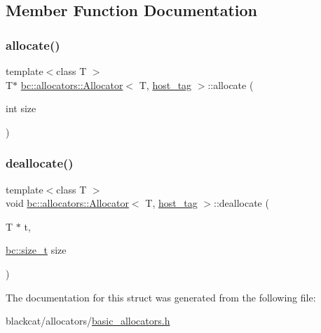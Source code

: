 \subsection{Member Function Documentation}
\mbox{\label{structbc_1_1allocators_1_1Allocator_3_01T_00_01host__tag_01_4_a7dc1bfcee83cc2986902722308a0a180}} 
\subsubsection{\texorpdfstring{allocate()}{allocate()}}
{\footnotesize\ttfamily template$<$class T $>$ \\
T$\ast$ \hyperlink{classbc_1_1allocators_1_1Allocator}{bc\+::allocators\+::\+Allocator}$<$ T, \hyperlink{structbc_1_1host__tag}{host\+\_\+tag} $>$\+::allocate (\begin{DoxyParamCaption}\item[{int}]{size }\end{DoxyParamCaption})\hspace{0.3cm}{\ttfamily [inline]}}

\mbox{\label{structbc_1_1allocators_1_1Allocator_3_01T_00_01host__tag_01_4_a57811db93d9898bedf13ea7abd9fa1b9}} 
\subsubsection{\texorpdfstring{deallocate()}{deallocate()}}
{\footnotesize\ttfamily template$<$class T $>$ \\
void \hyperlink{classbc_1_1allocators_1_1Allocator}{bc\+::allocators\+::\+Allocator}$<$ T, \hyperlink{structbc_1_1host__tag}{host\+\_\+tag} $>$\+::deallocate (\begin{DoxyParamCaption}\item[{T $\ast$}]{t,  }\item[{\hyperlink{namespacebc_aaf8e3fbf99b04b1b57c4f80c6f55d3c5}{bc\+::size\+\_\+t}}]{size }\end{DoxyParamCaption})\hspace{0.3cm}{\ttfamily [inline]}}



The documentation for this struct was generated from the following file\+:\begin{DoxyCompactItemize}
\item 
blackcat/allocators/\hyperlink{basic__allocators_8h}{basic\+\_\+allocators.\+h}\end{DoxyCompactItemize}
